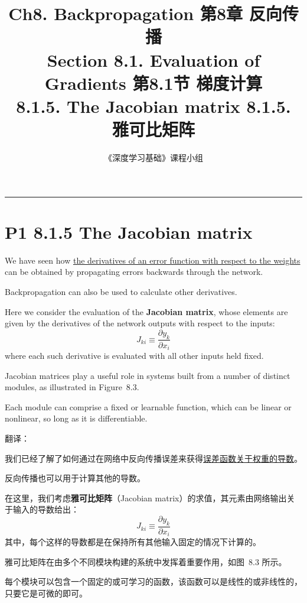 \documentclass{article}
\title{Ch8. Backpropagation \hfill 第8章 反向传播 \\ 
Section 8.1. Evaluation of Gradients \hfill 第8.1节 梯度计算 \\ 
8.1.5. The Jacobian matrix \hfill 8.1.5. 雅可比矩阵 }
\author{《深度学习基础》课程小组}
\begin{document}
\maketitle

\setlength{\parindent}{0pt} %
\setlength{\parskip}{1.5em} %

\noindent\rule{\linewidth}{0.4pt}

\section{P1 8.1.5 The Jacobian matrix}

We have seen how \underline{the derivatives of an error function with respect to the weights} can be obtained by propagating errors backwards through the network. 

Backpropagation can also be used to calculate other derivatives. 

Here we consider the evaluation of the \textbf{Jacobian matrix}, whose elements are given by the derivatives of the network outputs with respect to the inputs:
\begin{equation}
    J_{ki} \equiv \frac{\partial y_k}{\partial x_i}
    \tag{8.26}
\end{equation}
where each such derivative is evaluated with all other inputs held fixed. 

Jacobian matrices play a useful role in systems built from a number of distinct modules, as illustrated in Figure~8.3. 

Each module can comprise a fixed or learnable function, which can be linear or nonlinear, so long as it is differentiable.

{\color{red}
翻译：

我们已经了解了如何通过在网络中反向传播误差来获得\underline{误差函数关于权重的导数}。

反向传播也可以用于计算其他的导数。

在这里，我们考虑\textbf{雅可比矩阵}（Jacobian matrix）的求值，其元素由网络输出关于输入的导数给出：
\begin{equation}
    J_{ki} \equiv \frac{\partial y_k}{\partial x_i}
    \tag{8.26}
\end{equation}
其中，每个这样的导数都是在保持所有其他输入固定的情况下计算的。

雅可比矩阵在由多个不同模块构建的系统中发挥着重要作用，如图~8.3 所示。

每个模块可以包含一个固定的或可学习的函数，该函数可以是线性的或非线性的，只要它是可微的即可。
}
\end{document}
